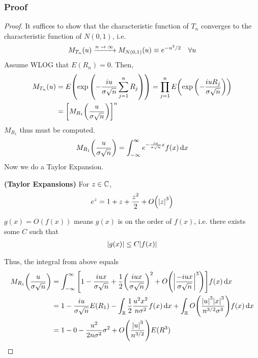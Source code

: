 \subsubsection{Proof}
\begin{proof}

It suffices to show that the characteristic function of $T_n$ converges to the characteristic function of $N(0,1)$, i.e.
\begin{align}
    M_{T_n}(u) \ce{->[$n \to \infty$]} M_{N(0,1)}(u) \equiv e^{-u^2/2} && \forall u
\end{align}
Assume WLOG that $E(R_n) = 0$. Then,
\begin{align}
    M_{T_n}(u) &= E\qty(\exp\qty(-\frac{iu}{\sigma \sqrt{n}}\sum_{j=1}^n R_j)) 
    = \prod_{j=1}^n E\qty(\exp\qty(-\frac{iuR_j}{\sigma \sqrt{n}})) \\
    &= \qty[M_{R_1}\qty(\frac{u}{\sigma\sqrt{n}})]^n
\end{align}
$M_{R_1}$ thus must be computed.
\begin{align}
    M_{R_1}\qty(\frac{u}{\sigma\sqrt{n}}) = \int_{-\infty}^\infty e^{-\frac{iu}{\sigma\sqrt{n}}x} f(x) \dd{x}
\end{align}
Now we do a Taylor Expansion.
\begin{aside}
    \textbf{(Taylor Expansions)} For $z \in \mathbb{C}$,
    \begin{align}
        e^z = 1 + z + \frac{z^2}{2} + O\qty(\abs{z}^3)
    \end{align}
    \begin{aside}
        $g(x) = O(f(x))$ means $g(x)$ is on the order of $f(x)$, i.e. there exists some $C$ such that
        \begin{align}
            \abs{g(x)} \le C \abs{f(x)}
        \end{align}
    \end{aside}
\end{aside}
Thus, the integral from above equals
\begin{align*}
    M_{R_1}\qty(\frac{u}{\sigma\sqrt{n}}) &= \int_{-\infty}^\infty \qty[1 - \frac{iux}{\sigma\sqrt{n}} + \frac{1}{2}\qty(\frac{iux}{\sigma\sqrt{n}})^2 + O\qty(\left| \frac{-iux}{\sigma\sqrt{n}} \right|^3)] f(x) \dd{x}\\
    &= 1 - \frac{iu}{\sigma\sqrt{n}} E(R_1) - \int_\real \frac{1}{2} \frac{u^2x^2}{n\sigma^2} f(x) \dd{x} + \int_\real O\qty(\frac{\abs{u}^3\abs{x}^3}{n^{3/2}\sigma^3}) f(x) \dd{x}\\
    &= 1 - 0 - \frac{u^2}{2n\sigma^2}\sigma^2 + O\qty(\frac{\abs{u}^3}{n^{3/2}})E(R^3)

\end{align*}
\end{proof}

